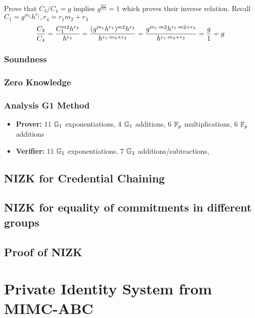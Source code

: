 Prove that $C_3/C_4 = g$ implies $g^{\frac{m1}{m2}} = 1$ which proves their inverse relation. Recall $C_1 = g^{m_1}h^{r_1}, r_4 = r_1m_2 + r_3$
\begin{align}
    \dfrac{C_3}{C_4} = \dfrac{C_1^{m2}h^{r_3}}{h^{r_4}} = \dfrac{(g^{m_1}h^{r_1})^{m2}h^{r_3}}{h^{r_1 \cdot m_2 + r_3}} = \dfrac{g^{m_1\cdot m2}h^{r_1\cdot m2 + r_3}}{h^{r_1 \cdot m_2 + r_3}} = \dfrac{g}{1} = g \notag \\
\end{align}

\subsubsection{Soundness}

\subsubsection{Zero Knowledge}

\subsubsection{Analysis G1 Method}
\begin{itemize}
    \item \textbf{Prover:} 11 $\mathbb{G}_1$ exponentiations, 4 $\mathbb{G}_1$ additions, 6 $\mathbb{F}_p$ multiplications, 6 $\mathbb{F}_p$ additions
    \item \textbf{Verifier:} 11 $\mathbb{G}_1$ exponentiations, 7 $\mathbb{G}_1$ additions/subtractions, 
\end{itemize}

\subsection{NIZK for Credential Chaining}
\subsection{NIZK for equality of commitments in different groups}




\subsection{Proof of NIZK}


\cleardoublepage
\section{Private Identity System from MIMC-ABC}\label{sec:idsys}

